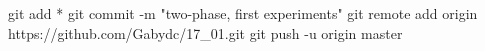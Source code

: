 git add *
git commit -m "two-phase, first experiments"
git remote add origin https://github.com/Gabydc/17_01.git
git push -u origin master
